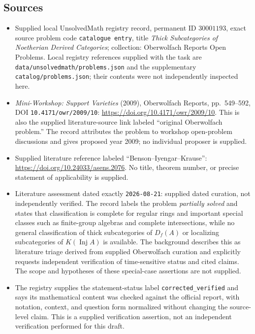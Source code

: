 \documentclass[11pt]{article}
\begin{document}
\subsection{Sources}
\begin{itemize}
\item Supplied local UnsolvedMath registry record, permanent ID \(30001193\), exact source problem code \texttt{catalogue entry}, title \emph{Thick Subcategories of Noetherian Derived Categories}; collection: Oberwolfach Reports Open Problems. Local registry references supplied with the task are \texttt{data/unsolvedmath/problems.json} and the supplementary \texttt{catalog/problems.json}; their contents were not independently inspected here.
\item \emph{Mini-Workshop: Support Varieties} (2009), Oberwolfach Reports, pp.\ 549--592, DOI \texttt{10.4171/owr/2009/10}: \url{https://doi.org/10.4171/owr/2009/10}. This is also the supplied literature-source link labeled ``original Oberwolfach problem.'' The record attributes the problem to workshop open-problem discussions and gives proposed year 2009; no individual proposer is supplied.
\item Supplied literature reference labeled ``Benson--Iyengar--Krause'': \url{https://doi.org/10.24033/asens.2076}. No title, theorem number, or precise statement of applicability is supplied.
\item Literature assessment dated exactly \texttt{2026-08-21}: supplied dated curation, not independently verified. The record labels the problem \emph{partially solved} and states that classification is complete for regular rings and important special classes such as finite-group algebras and complete intersections, while no general classification of thick subcategories of \(D_f(A)\) or localizing subcategories of \(K(\operatorname{Inj}A)\) is available. The background describes this as literature triage derived from supplied Oberwolfach curation and explicitly requests independent verification of time-sensitive status and cited claims. The scope and hypotheses of these special-case assertions are not supplied.
\item The registry supplies the statement-status label \texttt{corrected\_verified} and says its mathematical content was checked against the official report, with notation, context, and question form normalized without changing the source-level claim. This is a supplied verification assertion, not an independent verification performed for this draft.
\end{itemize}
\end{document}
